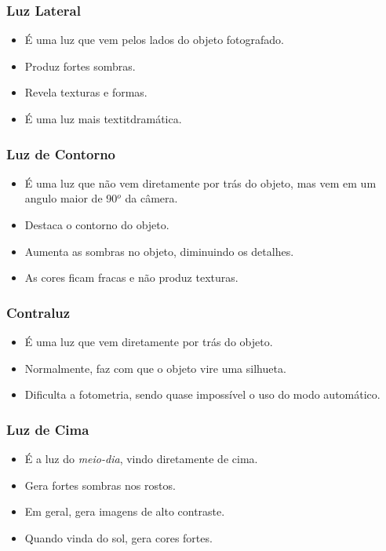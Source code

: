 \begin{frame}
  \frametitle{Luz Lateral}
  \begin{itemize}
    \item É uma luz que vem pelos lados do objeto fotografado.
    \item Produz fortes sombras.
    \item Revela texturas e formas.
    \item É uma luz mais textit{dramática}.
  \end{itemize}
\end{frame}


\begin{frame}
  \frametitle{Luz de Contorno}
  \begin{itemize}
    \item É uma luz que não vem diretamente por trás do objeto, mas vem em um angulo maior de 90$^o$ da câmera.
    \item Destaca o contorno do objeto.
    \item Aumenta as sombras no objeto, diminuindo os detalhes.
    \item As cores ficam fracas e não produz texturas.
  \end{itemize}
\end{frame}


\begin{frame}
  \frametitle{Contraluz}
  \begin{itemize}
    \item É uma luz que vem diretamente por trás do objeto.
    \item Normalmente, faz com que o objeto vire uma silhueta.
    \item Dificulta a fotometria, sendo quase impossível o uso do modo automático.
  \end{itemize}
\end{frame}


\begin{frame}
  \frametitle{Luz de Cima}
  \begin{itemize}
    \item É a luz do \textit{meio-dia}, vindo diretamente de cima.
    \item Gera fortes sombras nos rostos.
    \item Em geral, gera imagens de alto contraste.
    \item Quando vinda do sol, gera cores fortes.
  \end{itemize}
\end{frame}

